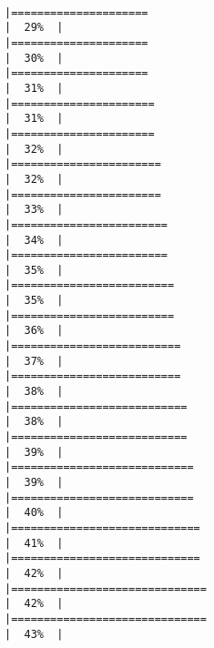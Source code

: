 \documentclass[
]{article}
\begin{document}
\begin{verbatim}
                                                     |=====================                                                 |  29%  |                                                                              |=====================                                                 |  30%  |                                                                              |=====================                                                 |  31%  |                                                                              |======================                                                |  31%  |                                                                              |======================                                                |  32%  |                                                                              |=======================                                               |  32%  |                                                                              |=======================                                               |  33%  |                                                                              |========================                                              |  34%  |                                                                              |========================                                              |  35%  |                                                                              |=========================                                             |  35%  |                                                                              |=========================                                             |  36%  |                                                                              |==========================                                            |  37%  |                                                                              |==========================                                            |  38%  |                                                                              |===========================                                           |  38%  |                                                                              |===========================                                           |  39%  |                                                                              |============================                                          |  39%  |                                                                              |============================                                          |  40%  |                                                                              |=============================                                         |  41%  |                                                                              |=============================                                         |  42%  |                                                                              |==============================                                        |  42%  |                                                                              |==============================                                        |  43%  |                          
\end{verbatim}
\end{document}
